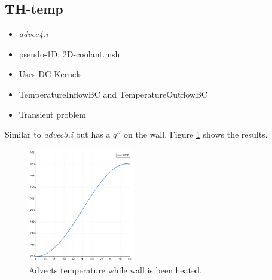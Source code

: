 \documentclass[11pt,letterpaper]{article}
\begin{document}
	\subsection{TH-temp}

	\begin{itemize}
		\item \textit{advec4.i}
		\item pseudo-1D: 2D-coolant.msh
		\item Uses DG Kernels
		\item TemperatureInflowBC and TemperatureOutflowBC
		\item Transient problem
	\end{itemize}

    Similar to \textit{advec3.i} but has a $q''$ on the wall.
    Figure \ref{fig:advec4} shows the results.

	\begin{figure}[htbp!]
		\centering
		\includegraphics[height=5cm]{advec4}
		\caption{Advects temperature while wall is been heated.}
		\label{fig:advec4}
	\end{figure}

\pagebreak

% 
\end{document}
